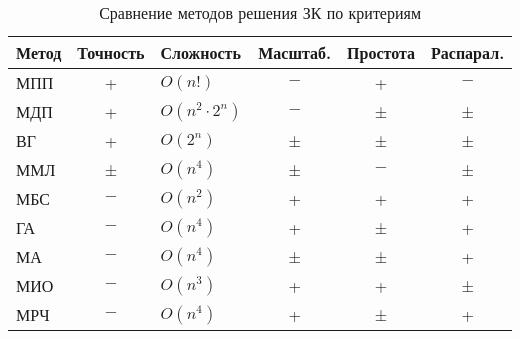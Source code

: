 \begin{table}[h!]
\centering
\captionsetup{justification=raggedright,singlelinecheck=off}
\caption{Сравнение методов решения ЗК по критериям}
\label{tbl:methods}
\begin{tabular}{|l|c|l|c|c|c|}
\hline
\textbf{Метод} & \textbf{Точность} & \textbf{Сложность} & \textbf{Масштаб.} & \textbf{Простота} & \textbf{Распарал.} \\
\hline
МПП & +  & $O(n!)$ & $-$ & + & $-$ \\
\hline
МДП & +  & $O(n^2 \cdot 2^n)$ & $-$ & ± & ± \\
\hline
ВГ & +  & $O(2^n)$ & ± & ± & ± \\
\hline
ММЛ & ±  & $O(n^4)$ & ± & $-$ & ± \\
\hline
МБС & $-$ & $O(n^2)$ & + & + & + \\
\hline
ГА & $-$ & $O(n^4)$ & + & ± & + \\
\hline
МА & $-$ & $O(n^4)$ & ± & ± & + \\
\hline
МИО & $-$ & $O(n^3)$ & + & + & ± \\
\hline
МРЧ & $-$ & $O(n^4)$ & + & ± & + \\
\hline
\end{tabular}
\end{table}